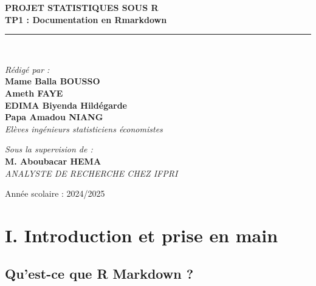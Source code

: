 \documentclass[
]{article}
\begin{document}
\begin{titlepage}
\begin{center}
        \textbf{\LARGE PROJET STATISTIQUES SOUS R }\\[0.3cm]
        \textbf{\Huge \color{black} \textsf{TP1 : Documentation en Rmarkdown}}\\[0.2cm]
        \rule{\linewidth}{0.2mm} \\[0.5cm]
        
        \begin{minipage}{0.5\textwidth}
    \begin{flushleft} \large
        \emph{\textsf{Rédigé par :}}\\
        \textbf{Mame Balla BOUSSO}\\
        \textbf{Ameth FAYE}\\
        \textbf{EDIMA Biyenda Hildégarde}\\
        \textbf{Papa Amadou NIANG}\\
        \textit{Elèves ingénieurs statisticiens économistes}
    \end{flushleft}
\end{minipage}
        \hfill
        \begin{minipage}{0.4\textwidth}
            \begin{flushright} \large
                \emph{\textsf{Sous la supervision de :}} \\
                \textbf{M. Aboubacar HEMA}\\
                \textit{ANALYSTE DE RECHERCHE CHEZ IFPRI }
            \end{flushright}
        \end{minipage}

        \vfill

        {\large \textsf{Année scolaire : 2024/2025}}\\[0.5cm]
        
    \end{center}
\end{titlepage}

\hypertarget{i.-introduction-et-prise-en-main}{%
\section{I. Introduction et prise en
main}\label{i.-introduction-et-prise-en-main}}

\hypertarget{quest-ce-que-r-markdown}{%
\subsection{Qu'est-ce que R Markdown ?}\label{quest-ce-que-r-markdown}}
\end{document}
